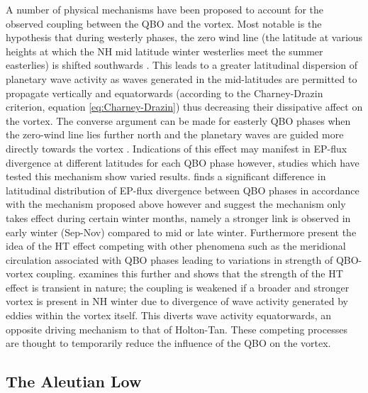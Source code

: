A number of physical mechanisms have been proposed to account for the observed coupling between the QBO and the vortex. Most notable is the hypothesis that during westerly phases, the zero wind line (the latitude at various heights at which the NH mid latitude winter westerlies meet the summer easterlies) is shifted southwards \citep{HoltonJamesRTan1980}. This leads to a greater latitudinal dispersion of planetary wave activity as waves generated in the mid-latitudes are permitted to propagate vertically and equatorwards (according to the Charney-Drazin criterion, equation \ref{eq:Charney-Drazin}) thus decreasing their dissipative affect on the vortex. The converse argument can be made for easterly QBO phases when the zero-wind line lies further north and the planetary waves are guided more directly towards the vortex \cite{luMechanisms2014c}. Indications of this effect may manifest in EP-flux divergence at different latitudes for each QBO phase however, studies which have tested this mechanism show varied results. \cite{hamiltonEffects1998} finds a significant difference in latitudinal distribution of EP-flux divergence between QBO phases in accordance with the mechanism proposed above however \cite{huTropospheric2002} and \cite{graySolar2004} suggest the mechanism only takes effect during certain winter months, namely a stronger link is observed in early winter (Sep-Nov) compared to mid or late winter. Furthermore \citep{garfinkelDoes2012} present the idea of the HT effect competing with other phenomena such as the meridional circulation associated with QBO phases leading to variations in strength of QBO-vortex coupling. \cite{luMechanisms2014c} examines this further and shows that the strength of the HT effect is transient in nature; the coupling is weakened if a broader and stronger vortex is present in NH winter due to divergence of wave activity generated by eddies within the vortex itself. This diverts wave activity equatorwards, an opposite driving mechanism to that of Holton-Tan. These competing processes are thought to temporarily reduce the influence of the QBO on the vortex.

\subsection{The Aleutian Low}
\label{sec:external_influence_AL}

